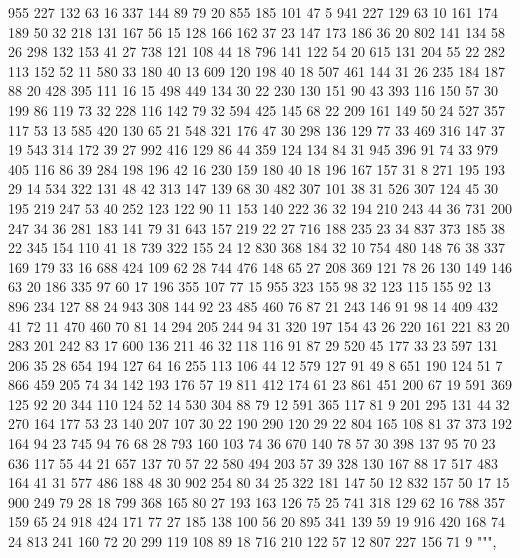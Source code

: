 \begin{pyverbatim}
{	955	227	132	63	16	337	144	89	79	20	855	185	101	47	5	941	227	129	63	10
	161	174	189	50	32	218	131	167	56	15	128	166	162	37	23	147	173	186	36	20
	802	141	134	58	26	298	132	153	41	27	738	121	108	44	18	796	141	122	54	20
	615	131	204	55	22	282	113	152	52	11	580	33	180	40	13	609	120	198	40	18
	507	461	144	31	26	235	184	187	88	20	428	395	111	16	15	498	449	134	30	22
	230	130	151	90	43	393	116	150	57	30	199	86	119	73	32	228	116	142	79	32
	594	425	145	68	22	209	161	149	50	24	527	357	117	53	13	585	420	130	65	21
	548	321	176	47	30	298	136	129	77	33	469	316	147	37	19	543	314	172	39	27
	992	416	129	86	44	359	124	134	84	31	945	396	91	74	33	979	405	116	86	39
	284	198	196	42	16	230	159	180	40	18	196	167	157	31	8	271	195	193	29	14
	534	322	131	48	42	313	147	139	68	30	482	307	101	38	31	526	307	124	45	30
	195	219	247	53	40	252	123	122	90	11	153	140	222	36	32	194	210	243	44	36
	731	200	247	34	36	281	183	141	79	31	643	157	219	22	27	716	188	235	23	34
	837	373	185	38	22	345	154	110	41	18	739	322	155	24	12	830	368	184	32	10
	754	480	148	76	38	337	169	179	33	16	688	424	109	62	28	744	476	148	65	27
	208	369	121	78	26	130	149	146	63	20	186	335	97	60	17	196	355	107	77	15
	955	323	155	98	32	123	115	155	92	13	896	234	127	88	24	943	308	144	92	23
	485	460	76	87	21	243	146	91	98	14	409	432	41	72	11	470	460	70	81	14
	294	205	244	94	31	320	197	154	43	26	220	161	221	83	20	283	201	242	83	17
	600	136	211	46	32	118	116	91	87	29	520	45	177	33	23	597	131	206	35	28
	654	194	127	64	16	255	113	106	44	12	579	127	91	49	8	651	190	124	51	7
	866	459	205	74	34	142	193	176	57	19	811	412	174	61	23	861	451	200	67	19
	591	369	125	92	20	344	110	124	52	14	530	304	88	79	12	591	365	117	81	9
	201	295	131	44	32	270	164	177	53	23	140	207	107	30	22	190	290	120	29	22
	804	165	108	81	37	373	192	164	94	23	745	94	76	68	28	793	160	103	74	36
	670	140	78	57	30	398	137	95	70	23	636	117	55	44	21	657	137	70	57	22
	580	494	203	57	39	328	130	167	88	17	517	483	164	41	31	577	486	188	48	30
	902	254	80	34	25	322	181	147	50	12	832	157	50	17	15	900	249	79	28	18
	799	368	165	80	27	193	163	126	75	25	741	318	129	62	16	788	357	159	65	24
	918	424	171	77	27	185	138	100	56	20	895	341	139	59	19	916	420	168	74	24
	813	241	160	72	20	299	119	108	89	18	716	210	122	57	12	807	227	156	71	9
	""",

}
\end{pyverbatim}
